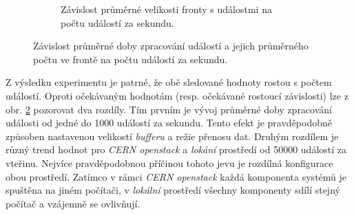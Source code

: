 \begin{figure}[h]
\begin{subfigure}[t!]{0.47\textwidth}
        \caption{Závislost průměrné velikosti fronty s událostmi na počtu událostí za sekundu.}
        \label{fig:test:exp1:zavyslost_na_poctu_udalosti:velikost_fronty}
        
    \end{subfigure}
        
    \caption{Závislost průměrné doby zpracování událostí a jejich průměrného počtu ve frontě na počtu událostí za sekundu.}
    \label{fig:test:exp1:zavyslost_na_poctu_udalosti}
\end{figure}

Z výsledku experimentu je patrné, že obě sledované hodnoty rostou s počtem událostí. Oproti očekávaným hodnotám (resp. očekávané rostoucí závislosti) lze z obr. \ref{fig:test:exp1:zavyslost_na_poctu_udalosti} pozorovat dva rozdíly. Tím prvním je vývoj průměrné doby zpracování události od jedné do 1000 událostí za sekundu. Tento efekt je pravděpodobně způsoben nastavenou velikostí \textit{bufferu} a režie přenosu dat. Druhým rozdílem je různý trend hodnot pro \textit{CERN openstack} a \textit{lokání} prostředí od 50000 událostí za vteřinu. Nejvíce pravděpodobnou příčinou tohoto jevu je rozdílná konfigurace obou prostředí. Zatímco v rámci \textit{CERN openstack} každá komponenta systémů je spuštěna na jiném počítači, v \textit{lokální} prostředí všechny komponenty sdílí stejný počítač a vzájemně se ovlivňují.